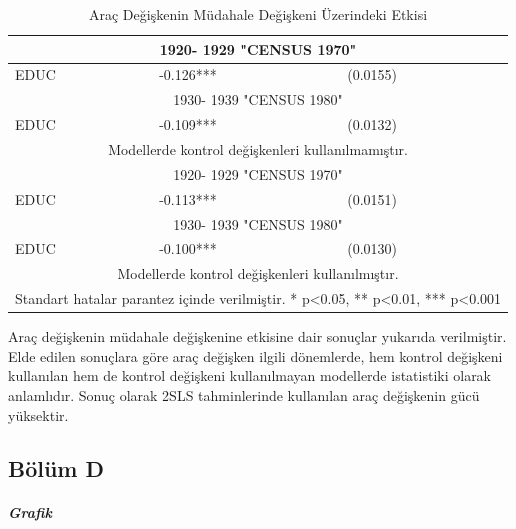 \documentclass[12pt, a4paper, showtrims]{article}
\begin{document}
\begin{justify}
\begin{justify}
\begin{justify}
\begin{justify}
    \begin{table}[h!]
        \centering
        \caption{Araç Değişkenin Müdahale Değişkeni Üzerindeki Etkisi}
        \begin{tabular}{|p{3cm}||p{4cm}|p{3cm}|}
        \hline \multicolumn{3}{|c|}{1920- 1929 "CENSUS 1970"} \\\hline    
        \hline EDUC & -0.126*** & (0.0155) \\ [0.5ex] 
        \hline \multicolumn{3}{|c|}{1930- 1939 "CENSUS 1980"} \\
        \hline EDUC & -0.109*** & (0.0132) \\ [0.5ex] \hline
        \hline \multicolumn{3}{|c|}{Modellerde kontrol değişkenleri kullanılmamıştır.} \\
        \hline \multicolumn{3}{|c|}{1920- 1929 "CENSUS 1970"} \\\hline
        \hline EDUC & -0.113*** & (0.0151) \\ [0.5ex] 
        \hline \multicolumn{3}{|c|}{1930- 1939 "CENSUS 1980"} \\    
        \hline EDUC & -0.100*** & (0.0130) \\ [0.5ex] \hline
        \hline \multicolumn{3}{|c|}{Modellerde kontrol değişkenleri kullanılmıştır.} \\\hline 
        \hline \multicolumn{3}{|c|}{Standart hatalar parantez içinde verilmiştir. * p<0.05, ** p<0.01, *** p<0.001} \\\hline  

        \end{tabular}
        
        \label{Tablo:1}
    \end{table}

    Araç değişkenin müdahale değişkenine etkisine dair sonuçlar yukarıda verilmiştir.
    Elde edilen sonuçlara göre araç değişken ilgili dönemlerde, hem kontrol 
    değişkeni kullanılan hem de kontrol değişkeni kullanılmayan modellerde istatistiki olarak
    anlamlıdır. Sonuç olarak 2SLS tahminlerinde kullanılan araç değişkenin gücü yüksektir. 

    \newpage
    \subsection*{Bölüm D}
    \setlength{\parindent}{0em}
    \setlength{\parskip}{0.3em}

    \subparagraph{Grafik}
    \begin{justify}
    \setlength{\parindent}{0em}


\end{justify}
\end{justify}
\end{justify}
\end{justify}
\end{justify}
\end{document}
